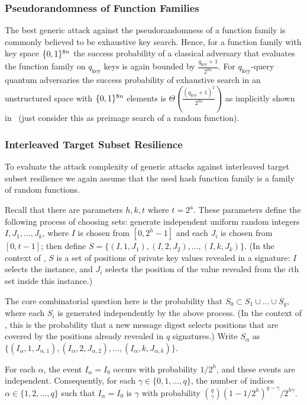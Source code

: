 \subsubsection{Pseudorandomness of Function Families}
The best generic attack against the pseudorandomness of a function 
family is commonly believed to be exhaustive key search. Hence, for a 
function family with key space $\{0,1\}^{8n}$ the success probability of 
a classical adversary that evaluates the function family on $q_{\text{key}}$ keys
is again bounded by $\frac{q_{\text{key}}+1}{2^{8n}}$. For $q_{\text{key}}$-query quantum adversaries the 
success probability of exhaustive search in an unstructured space with 
$\{0,1\}^{8n}$ elements is $\Theta(\frac{(q_{\text{key}}+1)^2}{2^{8n}})$ as implicitly shown 
in~\cite{Huelsing2016} (just consider this as preimage search of a random 
function).

\subsubsection{Interleaved Target Subset Resilience}
To evaluate the attack complexity of generic attacks against interleaved target 
subset resilience we again assume that the used hash function family is a 
family of random functions. 

Recall that there are parameters $h,k,t$ where $t=2^a$.
These parameters define the following process of choosing sets:
generate independent uniform random integers $I,J_1,\dots,J_k$,
where $I$ is chosen from $[0,2^h-1]$
and each $J_i$ is chosen from $[0,t-1]$;
then define $S=\{(I,1,J_1),(I,2,J_2),\dots,(I,k,J_k)\}$.
(In the context of \spx,
$S$ is a set of positions of \fors private key values revealed in a signature:
$I$ selects the \fors instance,
and $J_i$ selects the position of the value revealed
from the $i$th set inside this \fors instance.)

The core combinatorial question here
is the probability that $S_0\subset S_1\cup\dots\cup S_q$,
where each $S_i$ is generated independently by the above process.
(In the context of \spx,
this is the probability that a new message digest
selects \fors positions that are covered
by the positions already revealed in $q$ signatures.)
Write $S_\alpha$
as $\{(I_\alpha,1,J_{\alpha,1}),(I_\alpha,2,J_{\alpha,2}),\dots,(I_\alpha,k,J_{\alpha,k})\}$.

For each $\alpha$,
the event $I_\alpha=I_0$ occurs with probability $1/2^h$,
and these events are independent.
Consequently,
for each $\gamma\in\{0,1,\dots,q\}$,
the number of indices $\alpha\in\{1,2,\dots,q\}$
such that $I_\alpha=I_0$
is $\gamma$ with probability ${q\choose \gamma} (1-1/2^h)^{q-\gamma}/2^{h\gamma}$.

